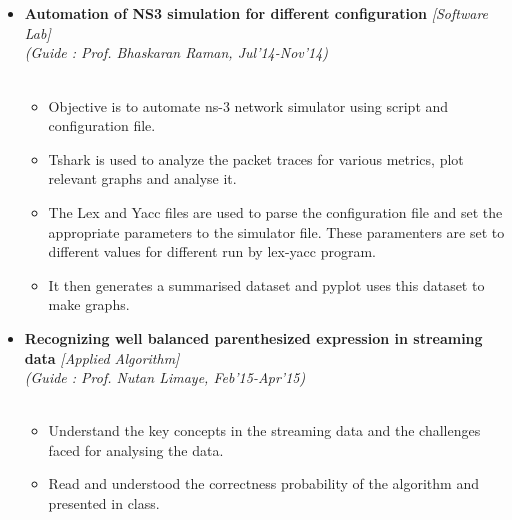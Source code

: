 \\[-0.7cm]\\
\begin{itemize}
	\item \textbf{Automation of NS3 simulation for different configuration} \hfill \emph{[Software Lab]} \\
	\emph{(Guide : Prof. Bhaskaran Raman, Jul'14-Nov'14)} \hfill \\[-1cm]\\ 
\begin{itemize}
\item Objective is to automate ns-3  network  simulator using script and configuration file.  
\item Tshark is used to analyze the packet traces for various metrics, plot relevant graphs and analyse it.
\item The Lex and Yacc files are used to parse the configuration file and set the appropriate parameters to the simulator file. These paramenters are set to different values for different run by lex-yacc program. 
\item It then generates a summarised dataset and pyplot uses this dataset to make graphs.
\end{itemize}
\item \textbf{Recognizing well balanced parenthesized expression in streaming data} \hfill \emph{[Applied Algorithm]} \\
	\emph{(Guide : Prof. Nutan Limaye, Feb'15-Apr'15)} \hfill \\[-1cm]\\ 
\begin{itemize}
\item Understand the key concepts in the streaming data and the challenges faced for analysing the data.
\item Read and understood the correctness probability of the algorithm and presented in class.
\end{itemize}
\end{itemize}
